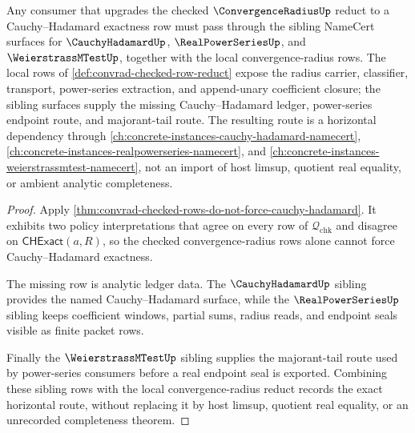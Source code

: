\begin{theorem}
\label{thm:convergence-radius-cauchy-hadamard-sibling-route}
Any consumer that upgrades the checked $\ConvergenceRadiusUp$ reduct to a
Cauchy--Hadamard exactness row must pass through the sibling NameCert surfaces
for $\CauchyHadamardUp$, $\RealPowerSeriesUp$, and $\WeierstrassMTestUp$,
together with the local convergence-radius rows. The local rows of
\autoref{def:convrad-checked-row-reduct} expose the radius carrier,
classifier, transport, power-series extraction, and append-unary coefficient
closure; the sibling surfaces supply the missing Cauchy--Hadamard ledger,
power-series endpoint route, and majorant-tail route. The resulting route is a
horizontal dependency through
\autoref{ch:concrete-instances-cauchy-hadamard-namecert},
\autoref{ch:concrete-instances-realpowerseries-namecert}, and
\autoref{ch:concrete-instances-weierstrassmtest-namecert}, not an import of
host limsup, quotient real equality, or ambient analytic completeness.
\end{theorem}
\begin{proof}
Apply \autoref{thm:convrad-checked-rows-do-not-force-cauchy-hadamard}. It
exhibits two policy interpretations that agree on every row of
$\mathcal Q_{\mathrm{chk}}$ and disagree on
$\mathsf{CHExact}(a,R)$, so the checked convergence-radius rows alone cannot
force Cauchy--Hadamard exactness.

The missing row is analytic ledger data. The $\CauchyHadamardUp$ sibling
provides the named Cauchy--Hadamard surface, while the
$\RealPowerSeriesUp$ sibling keeps coefficient windows, partial sums, radius
reads, and endpoint seals visible as finite packet rows.

Finally the $\WeierstrassMTestUp$ sibling supplies the majorant-tail route used
by power-series consumers before a real endpoint seal is exported. Combining
these sibling rows with the local convergence-radius reduct records the exact
horizontal route, without replacing it by host limsup, quotient real equality,
or an unrecorded completeness theorem.
\end{proof}
